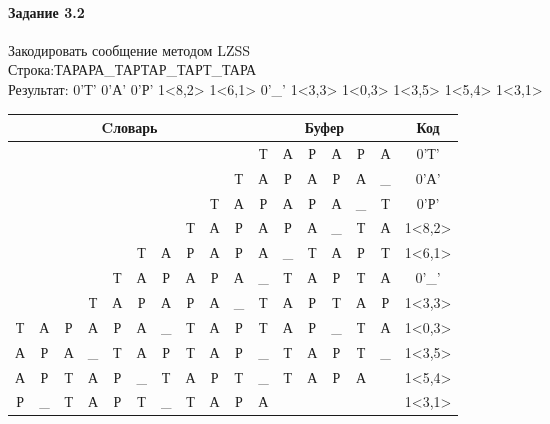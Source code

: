 \documentclass[a4paper, 12pt]{article}
\begin{document}
\paragraph{Задание 3.2}

Закодировать сообщение методом LZSS\\
Строка:ТАРАРА\_ТАРТАР\_ТАРТ\_ТАРА\\
Результат: 0'Т' 0'А' 0'Р' 1<8,2> 1<6,1> 0'\_' 1<3,3> 1<0,3> 1<3,5> 1<5,4> 1<3,1>\\
\begin{table}[h!]
\centering
\begin{tabular}{|c|c|c|c|c|c|c|c|c|c|c|c|c|c|c|c|c|}
\hline
\multicolumn{10}{|c|}{Cловарь} & \multicolumn{6}{c|}{Буфер} & Код  \\ \hline
  &   &   &   &   &   &   &   &   &   & Т & А & Р & А & Р & А & 0'Т'\\ \hline
  &   &   &   &   &   &   &   &   & Т & А & Р & А & Р & А & \_ & 0'А'\\ \hline
  &   &   &   &   &   &   &   & Т & А & Р & А & Р & А & \_ & Т & 0'Р'\\ \hline
  &   &   &   &   &   &   & Т & \cellcolor[HTML]{FFFF00} А & \cellcolor[HTML]{FFFF00} Р & \cellcolor[HTML]{FFFF00} А & \cellcolor[HTML]{FFFF00} Р & А & \_ & Т & А & 1<8,2>\\ \hline
  &   &   &   &   & Т & \cellcolor[HTML]{FFFF00} А & Р & А & Р & \cellcolor[HTML]{FFFF00} А & \_ & Т & А & Р & Т & 1<6,1>\\ \hline
  &   &   &   & Т & А & Р & А & Р & А & \_ & Т & А & Р & Т & А & 0'\_'\\ \hline
  &   &   & \cellcolor[HTML]{FFFF00} Т & \cellcolor[HTML]{FFFF00} А & \cellcolor[HTML]{FFFF00} Р & А & Р & А & \_ & \cellcolor[HTML]{FFFF00} Т & \cellcolor[HTML]{FFFF00} А & \cellcolor[HTML]{FFFF00} Р & Т & А & Р & 1<3,3>\\ \hline
\cellcolor[HTML]{FFFF00} Т & \cellcolor[HTML]{FFFF00} А & \cellcolor[HTML]{FFFF00} Р & А & Р & А & \_ & Т & А & Р & \cellcolor[HTML]{FFFF00} Т & \cellcolor[HTML]{FFFF00} А & \cellcolor[HTML]{FFFF00} Р & \_ & Т & А & 1<0,3>\\ \hline
А & Р & А & \cellcolor[HTML]{FFFF00} \_ & \cellcolor[HTML]{FFFF00} Т & \cellcolor[HTML]{FFFF00} А & \cellcolor[HTML]{FFFF00} Р & \cellcolor[HTML]{FFFF00} Т & А & Р & \cellcolor[HTML]{FFFF00} \_ & \cellcolor[HTML]{FFFF00} Т & \cellcolor[HTML]{FFFF00} А & \cellcolor[HTML]{FFFF00} Р & \cellcolor[HTML]{FFFF00} Т & \_ & 1<3,5>\\ \hline
А & Р & Т & А & Р & \cellcolor[HTML]{FFFF00} \_ & \cellcolor[HTML]{FFFF00} Т & \cellcolor[HTML]{FFFF00} А & \cellcolor[HTML]{FFFF00} Р & Т & \cellcolor[HTML]{FFFF00} \_ & \cellcolor[HTML]{FFFF00} Т & \cellcolor[HTML]{FFFF00} А & \cellcolor[HTML]{FFFF00} Р & А &   & 1<5,4>\\ \hline
Р & \_ & Т & \cellcolor[HTML]{FFFF00} А & Р & Т & \_ & Т & А & Р & \cellcolor[HTML]{FFFF00} А &   &   &   &   &   & 1<3,1>\\ \hline
\end{tabular}
\end{table}
\end{document}
